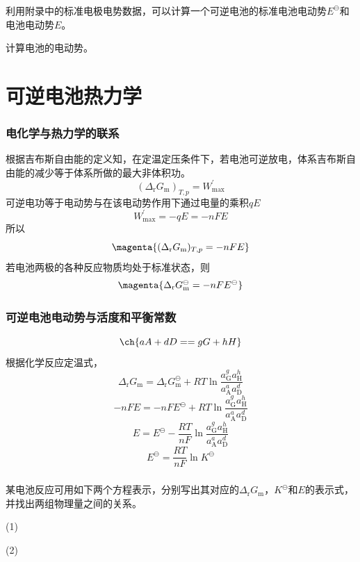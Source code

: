 \documentclass[dvipsnames, svgnames, x11names]{beamer}
\begin{document}
\begin{frame}[t]
    \frametitle{}
    利用附录中的标准电极电势数据，可以计算一个可逆电池的标准电池电动势$E^{\ominus}$和电池电动势$E$。
    \begin{question}
        计算电池的电动势。
    \end{question}
\end{frame}



\section{可逆电池热力学}


\begin{frame}
    \frametitle{电化学与热力学的联系}

    根据吉布斯自由能的定义知，在定温定压条件下，若电池可逆放电，体系吉布斯自由能的减少等于体系所做的最大非体积功。
    \[
        (\Delta_\mathrm{r}G_\mathrm{m})_{T,p} = W_\mathrm{max}^{'}
    \]
    可逆电功等于电动势与在该电动势作用下通过电量的乘积$qE$
    \[
        W_\mathrm{max}^{'} = -qE = -nFE
    \]
    所以
    \[
        \magenta{(\Delta_\mathrm{r}G_\mathrm{m})_{T,p} = -nFE}
    \]
    若电池两极的各种反应物质均处于标准状态，则
    \[
        \magenta{\Delta_\mathrm{r}G_\mathrm{m}^\ominus = -nFE^\ominus}
    \]

\end{frame}


\begin{frame}
    \frametitle{可逆电池电动势与活度和平衡常数}
    \[
        \ch{aA + dD == gG + hH}
    \]
    根据化学反应定温式，
    \[
        \Delta_{\mathrm{r}} G_{\mathrm{m}}=\Delta_{\mathrm{r}} G_{\mathrm{m}}^{\ominus}+R T \ln \frac{a_{\mathrm{G}}^{g} a_{\mathrm{H}}^{h}}{a_{\mathrm{A}}^{a} a_{\mathrm{D}}^{d}}
    \]
    \[
        -n F E=-n F E^{\ominus}+R T \ln \frac{a_{\mathrm{G}}^{g} a_{\mathrm{H}}^{h}}{a_{\mathrm{A}}^{a} a_{\mathrm{D}}^{d}}
    \]
    \[
        E=E^{\ominus}-\frac{R T}{n F} \ln \frac{a_{\mathrm{G}}^{g} a_{\mathrm{H}}^{h}}{a_{\mathrm{A}}^{a} a_{\mathrm{D}}^{d}}
    \]
    \[
        E^{\ominus}=\frac{R T}{n F} \ln K^{\ominus}
    \]

\end{frame}


\begin{frame}[t]
    \frametitle{}

    \begin{example}
        某电池反应可用如下两个方程表示，分别写出其对应的$\Delta_\mathrm{r}G_\mathrm{m}$，$K^{\ominus}$和$E$的表示式，并找出两组物理量之间的关系。

        (1) 

        (2) 
    \end{example}

\end{frame}
\end{document}
